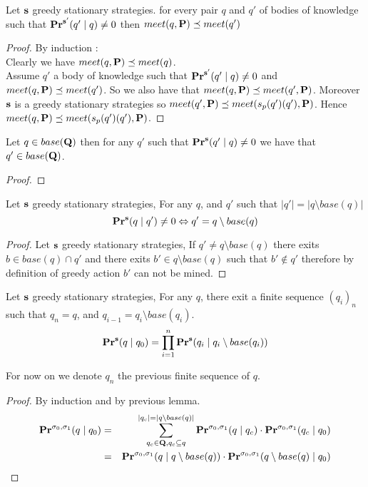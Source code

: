 \begin{mylem}
	\label{lem-meet}
	Let $\mathbf{s}$ greedy stationary strategies. for every pair $q$ and $q'$ of bodies of knowledge such that $\mathbf{Pr}^{\mathbf{s}'}(q' \mid q) \neq 0$ then $meet(q,\mathbf{P}) \preceq meet(q')$
\end{mylem}	
\begin{proof}
	By induction : 
	\\Clearly we have $meet(q,\mathbf{P}) \preceq meet(q)$.
	\\Assume $q'$ a body of knowledge such that $\mathbf{Pr}^{\mathbf{s}'}(q' \mid q) \neq 0$ and $meet(q,\mathbf{P}) \preceq meet(q')$. So we also have that $meet(q,\mathbf{P}) \preceq meet(q',\mathbf{P})$. Moreover $\mathbf{s}$ is a greedy stationary strategies so $meet(q',\mathbf{P}) \preceq meet(s_p(q')(q'),\mathbf{P})$. Hence $meet(q,\mathbf{P}) \preceq meet(s_p(q')(q'),\mathbf{P})$.
	
\end{proof}


\begin{mylem}
	\label{lem2}
	Let $q \in base(\mathbf{Q})$ then for any $q'$ such that $\mathbf{Pr}^{\mathbf{s}}(q' \mid q) \neq 0$ we have that $q' \in base(\mathbf{Q})$.
\end{mylem}
\begin{proof}
\end{proof}

\begin{mylem}
	\label{lem3}
	Let $\mathbf{s}$ greedy stationary strategies,
	For any $q$, and $q'$ such that $|q'| = |q \setminus base(q)|$
	$$\mathbf{Pr}^{\mathbf{s}}(q \mid q') \neq 0 \Leftrightarrow q' = q \setminus base(q)$$
\end{mylem}
\begin{proof}
	Let $\mathbf{s}$ greedy stationary strategies, If $q' \neq q \setminus base(q)$ there exits $b \in base(q) \cap q'$ and there exits $b' \in q \setminus base(q)$ such that $b' \notin q'$ therefore by definition of greedy action $b'$ can not be mined.
\end{proof}

\begin{mylem}
	Let $\mathbf{s}$ greedy stationary strategies,
	For any $q$, there exit a finite sequence $(q_i)_{n}$ such that $q_n = q$, and $q_{i-1} = q_i \setminus base(q_i)$.
	$$\mathbf{Pr}^{\mathbf{s}}(q \mid q_0) = \prod_{i = 1}^{n}\mathbf{Pr}^{\mathbf{s}}(q_i \mid q_{i} \setminus base(q_{i}))$$
\end{mylem}
For now on we denote $q_n$ the previous finite sequence of $q$.
\begin{proof}
	By induction and by previous lemma.
\begin{eqnarray*}
	\mathbf{Pr}^{\sigma_0,\sigma_1}(q \mid q_0) & = & \sum_{q_c \in \mathbf{Q}, q_c \subseteq q}^{|q_c| = |q \setminus base(q)|} \mathbf{Pr}^{\sigma_0,\sigma_1}(q \mid q_c) \cdot  	\mathbf{Pr}^{\sigma_0,\sigma_1}(q_c \mid q_0)	\\
	&=& \mathbf{Pr}^{\sigma_0,\sigma_1}(q \mid q \setminus base(q)) \cdot \mathbf{Pr}^{\sigma_0,\sigma_1}(q \setminus base(q) \mid q_0) \\
\end{eqnarray*}

\end{proof}

